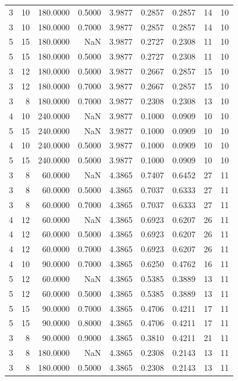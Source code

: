 \begin{tabular}{rrrrrrrrr}
3 & 10 & 180.0000 & 0.5000 & 3.9877 & 0.2857 & 0.2857 & 14 & 10 \\
3 & 10 & 180.0000 & 0.7000 & 3.9877 & 0.2857 & 0.2857 & 14 & 10 \\
5 & 15 & 180.0000 & NaN & 3.9877 & 0.2727 & 0.2308 & 11 & 10 \\
5 & 15 & 180.0000 & 0.5000 & 3.9877 & 0.2727 & 0.2308 & 11 & 10 \\
3 & 12 & 180.0000 & 0.5000 & 3.9877 & 0.2667 & 0.2857 & 15 & 10 \\
3 & 12 & 180.0000 & 0.7000 & 3.9877 & 0.2667 & 0.2857 & 15 & 10 \\
3 & 8 & 180.0000 & 0.7000 & 3.9877 & 0.2308 & 0.2308 & 13 & 10 \\
4 & 10 & 240.0000 & NaN & 3.9877 & 0.1000 & 0.0909 & 10 & 10 \\
5 & 15 & 240.0000 & NaN & 3.9877 & 0.1000 & 0.0909 & 10 & 10 \\
4 & 10 & 240.0000 & 0.5000 & 3.9877 & 0.1000 & 0.0909 & 10 & 10 \\
5 & 15 & 240.0000 & 0.5000 & 3.9877 & 0.1000 & 0.0909 & 10 & 10 \\
3 & 8 & 60.0000 & NaN & 4.3865 & 0.7407 & 0.6452 & 27 & 11 \\
3 & 8 & 60.0000 & 0.5000 & 4.3865 & 0.7037 & 0.6333 & 27 & 11 \\
3 & 8 & 60.0000 & 0.7000 & 4.3865 & 0.7037 & 0.6333 & 27 & 11 \\
4 & 12 & 60.0000 & NaN & 4.3865 & 0.6923 & 0.6207 & 26 & 11 \\
4 & 12 & 60.0000 & 0.5000 & 4.3865 & 0.6923 & 0.6207 & 26 & 11 \\
4 & 12 & 60.0000 & 0.7000 & 4.3865 & 0.6923 & 0.6207 & 26 & 11 \\
4 & 10 & 90.0000 & 0.7000 & 4.3865 & 0.6250 & 0.4762 & 16 & 11 \\
5 & 12 & 60.0000 & NaN & 4.3865 & 0.5385 & 0.3889 & 13 & 11 \\
5 & 12 & 60.0000 & 0.5000 & 4.3865 & 0.5385 & 0.3889 & 13 & 11 \\
5 & 15 & 90.0000 & 0.7000 & 4.3865 & 0.4706 & 0.4211 & 17 & 11 \\
5 & 15 & 90.0000 & 0.8000 & 4.3865 & 0.4706 & 0.4211 & 17 & 11 \\
3 & 8 & 90.0000 & 0.9000 & 4.3865 & 0.3810 & 0.4211 & 21 & 11 \\
3 & 8 & 180.0000 & NaN & 4.3865 & 0.2308 & 0.2143 & 13 & 11 \\
3 & 8 & 180.0000 & 0.5000 & 4.3865 & 0.2308 & 0.2143 & 13 & 11 \\

\end{tabular}
